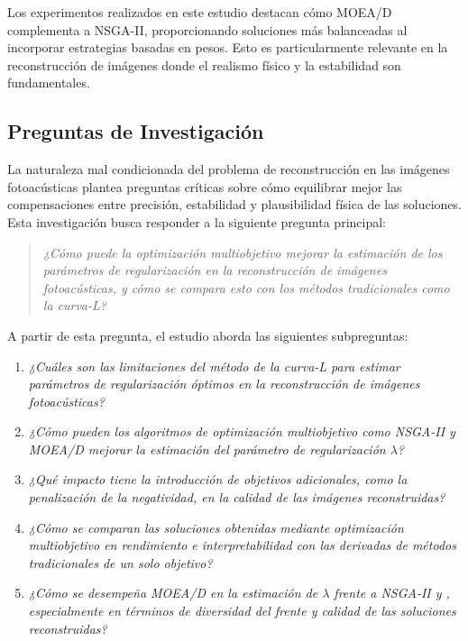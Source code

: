 Los experimentos realizados en este estudio destacan cómo MOEA/D complementa a NSGA-II, proporcionando soluciones más balanceadas al incorporar estrategias basadas en pesos. Esto es particularmente relevante en la reconstrucción de imágenes donde el realismo físico y la estabilidad son fundamentales.

\subsection{Preguntas de Investigación} \label{sec:ques}

La naturaleza mal condicionada del problema de reconstrucción en las imágenes fotoacústicas plantea preguntas críticas sobre cómo equilibrar mejor las compensaciones entre precisión, estabilidad y plausibilidad física de las soluciones. Esta investigación busca responder a la siguiente pregunta principal:

\begin{quote}
    \textit{¿Cómo puede la optimización multiobjetivo mejorar la estimación de los parámetros de regularización en la reconstrucción de imágenes fotoacústicas, y cómo se compara esto con los métodos tradicionales como la curva-L?}
\end{quote}

A partir de esta pregunta, el estudio aborda las siguientes subpreguntas:

\begin{enumerate}[start=1,label={RQ\arabic*:},wide = 0pt, leftmargin = 3em]
    \item \textit{¿Cuáles son las limitaciones del método de la curva-L para estimar parámetros de regularización óptimos en la reconstrucción de imágenes fotoacústicas?}
    \item \textit{¿Cómo pueden los algoritmos de optimización multiobjetivo como NSGA-II y MOEA/D mejorar la estimación del parámetro de regularización \( \lambda \)?}
    \item \textit{¿Qué impacto tiene la introducción de objetivos adicionales, como la penalización de la negatividad, en la calidad de las imágenes reconstruidas?}
    \item \textit{¿Cómo se comparan las soluciones obtenidas mediante optimización multiobjetivo en rendimiento e interpretabilidad con las derivadas de métodos tradicionales de un solo objetivo?}
    \item \textit{¿Cómo se desempeña MOEA/D en la estimación de \( \lambda \) frente a NSGA-II y , especialmente en términos de diversidad del frente y calidad de las soluciones reconstruidas?}
\end{enumerate}

